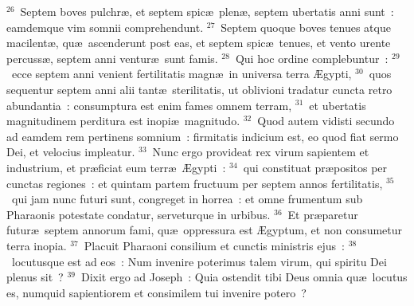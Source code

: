 ${}^{26}$~Septem boves pulchr\ae , et septem spic\ae\ plen\ae , septem ubertatis anni sunt~: eamdemque vim somnii comprehendunt.
${}^{27}$~Septem quoque boves tenues atque macilent\ae , qu\ae\ ascenderunt post eas, et septem spic\ae\ tenues, et vento urente percuss\ae , septem anni ventur\ae\ sunt famis.
${}^{28}$~Qui hoc ordine complebuntur~:
${}^{29}$~ecce septem anni venient fertilitatis magn\ae\ in universa terra \AE gypti,
${}^{30}$~quos sequentur septem anni alii tant\ae\ sterilitatis, ut oblivioni tradatur cuncta retro abundantia~: consumptura est enim fames omnem terram,
${}^{31}$~et ubertatis magnitudinem perditura est inopi\ae\ magnitudo.
${}^{32}$~Quod autem vidisti secundo ad eamdem rem pertinens somnium~: firmitatis indicium est, eo quod fiat sermo Dei, et velocius impleatur.
${}^{33}$~Nunc ergo provideat rex virum sapientem et industrium, et pr\ae ficiat eum terr\ae\ \AE gypti~:
${}^{34}$~qui constituat pr\ae positos per cunctas regiones~: et quintam partem fructuum per septem annos fertilitatis,
${}^{35}$~qui jam nunc futuri sunt, congreget in horrea~: et omne frumentum sub Pharaonis potestate condatur, serveturque in urbibus.
${}^{36}$~Et pr\ae paretur futur\ae\ septem annorum fami, qu\ae\ oppressura est \AE gyptum, et non consumetur terra inopia.
${}^{37}$~Placuit Pharaoni consilium et cunctis ministris ejus~:
${}^{38}$~locutusque est ad eos~: Num invenire poterimus talem virum, qui spiritu Dei plenus sit~?
${}^{39}$~Dixit ergo ad Joseph~: Quia ostendit tibi Deus omnia qu\ae\ locutus es, numquid sapientiorem et consimilem tui invenire potero~?


